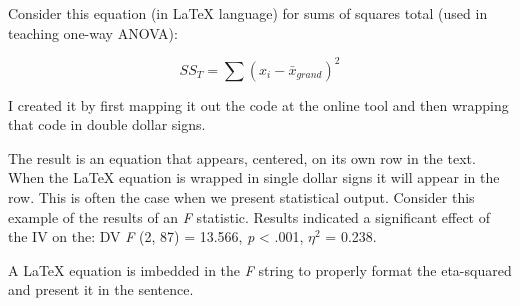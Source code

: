 \documentclass[
]{book}
\newenvironment{Shaded}{\begin{snugshade}}{\end{snugshade}}
\newcommand{\ControlFlowTok}[1]{\textcolor[rgb]{0.13,0.29,0.53}{\textbf{#1}}}
\newcommand{\DecValTok}[1]{\textcolor[rgb]{0.00,0.00,0.81}{#1}}
\newcommand{\ErrorTok}[1]{\textcolor[rgb]{0.64,0.00,0.00}{\textbf{#1}}}
\newcommand{\FloatTok}[1]{\textcolor[rgb]{0.00,0.00,0.81}{#1}}
\newcommand{\FunctionTok}[1]{\textcolor[rgb]{0.00,0.00,0.00}{#1}}
\newcommand{\NormalTok}[1]{#1}
\newcommand{\OtherTok}[1]{\textcolor[rgb]{0.56,0.35,0.01}{#1}}
\newcommand{\SpecialCharTok}[1]{\textcolor[rgb]{0.00,0.00,0.00}{#1}}
\begin{document}
Consider this equation (in LaTeX language) for sums of squares total (used in teaching one-way ANOVA):

\[SS_{T}= \sum (x_{i}-\bar{x}_{grand})^{2}\]

I created it by first mapping it out the code at the online tool and then wrapping that code in double dollar signs.

\begin{Shaded}
\end{Shaded}

The result is an equation that appears, centered, on its own row in the text. When the LaTeX equation is wrapped in single dollar signs it will appear in the row. This is often the case when we present statistical output. Consider this example of the results of an \emph{F} statistic. Results indicated a significant effect of the IV on the: DV \emph{F} (2, 87) = 13.566, \emph{p} \textless{} .001, \(\eta^2\) = 0.238.

A LaTeX equation is imbedded in the \emph{F} string to properly format the eta-squared and present it in the sentence.

\begin{Shaded}
\end{Shaded}


  
\end{document}
